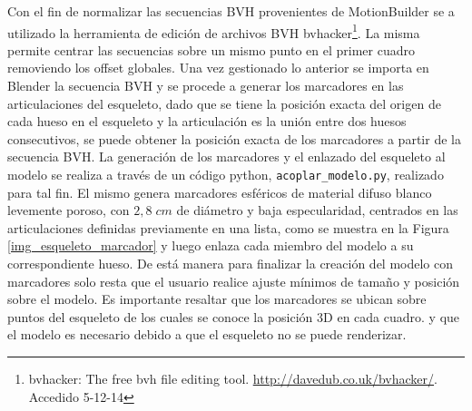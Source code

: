  Con el fin de normalizar las secuencias BVH provenientes de MotionBuilder se a utilizado la herramienta de edición de archivos BVH bvhacker\footnote{bvhacker: The free bvh file editing tool. \textcolor{blue}{\underline{\url{ http://davedub.co.uk/bvhacker/}}}. Accedido 5-12-14}. La misma permite centrar las secuencias sobre un mismo punto en el primer cuadro removiendo los offset globales.
 Una vez gestionado lo anterior se importa en Blender la secuencia BVH y se procede a generar los marcadores en las articulaciones del esqueleto, dado que se tiene la posición exacta del origen de cada hueso en el esqueleto y la articulación es la unión entre dos huesos consecutivos, se puede obtener la posición exacta de los marcadores a partir de la secuencia BVH.
 La generación de los marcadores y el enlazado del esqueleto al modelo se realiza a través de un código python, \texttt{acoplar\_modelo.py}, realizado para tal fin. El mismo genera marcadores esféricos de material difuso blanco levemente poroso, con $2,8 \;cm$ de diámetro y baja especularidad, centrados en las articulaciones definidas previamente en una lista, como se muestra en la Figura \ref{img_esqueleto_marcador} y luego enlaza cada miembro del modelo a su correspondiente hueso. De está manera para finalizar la creación del modelo con marcadores solo resta que el usuario realice ajuste mínimos de tamaño y posición sobre el modelo. Es importante resaltar que los marcadores se ubican sobre puntos del esqueleto de los cuales se conoce la posición 3D en cada cuadro. y que el modelo es necesario debido a que el esqueleto no se puede renderizar. 
 
